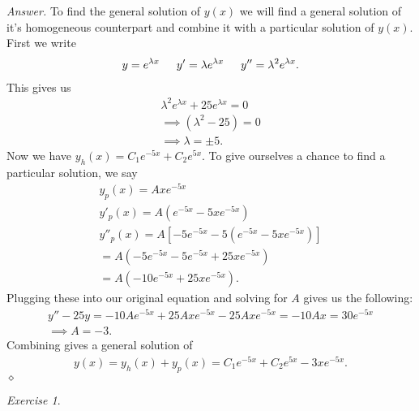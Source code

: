 \documentclass[12pt,oneside]{amsart}
\theoremstyle{definition}
\theoremstyle{remark}
\newtheorem{exer}{Exercise}
\numberwithin{equation}{exer}
\newenvironment{answer}{\bigskip\noindent\emph{Answer.}}{\hfill$\diamond$\newline}
\begin{document}
\begin{answer}
To find the general solution of $y(x)$ we will find a general solution of it's homogeneous counterpart and combine it with a particular solution of $y(x)$. First we write 
\begin{align*}
    y = e^{\lambda x } \indent y' = \lambda e^{\lambda x } \indent y''= \lambda^2e^{\lambda x}.
\end{align*}
This gives us 
\begin{align*}
    \lambda^2 e^{\lambda x} + 25 e^{\lambda x} = 0 \\
   \implies (\lambda ^2 - 25) = 0 \\
   \implies \lambda = \pm 5 .
\end{align*}
Now we have $y_h(x) = C_1 e^{-5x} + C_2 e^{5x}$. To give ourselves a chance to find a particular solution, we say 
\begin{align*}
    y_p(x)=Axe^{-5x} \\
    y'_p(x) = A(e^{-5x}-5xe^{-5x})\\
    y''_p(x) = A[-5e^{-5x} - 5(e^{-5x} -5xe^{-5x})] \\
    = A(-5e^{-5x} - 5e^{-5x} +25xe^{-5x})\\
    =A(-10e^{-5x} + 25xe^{-5x}).
\end{align*}
Plugging these into our original equation and solving for $A$ gives us the following:
\begin{align*}
    y'' - 25y = -10Ae^{-5x} + 25Axe^{-5x} - 25Axe^{-5x} = -10Ax = 30e^{-5x} \\
    \implies A=-3.
\end{align*}
\indent \newline
Combining gives a general solution of
\begin{align*}
    y(x)=y_h(x) + y_p(x) = C_1 e^{-5x} + C_2 e^{5x} - 3 x e^{-5x}.
\end{align*}
\end{answer}
\newpage
\begin{exer}

\end{exer}
\end{document}
